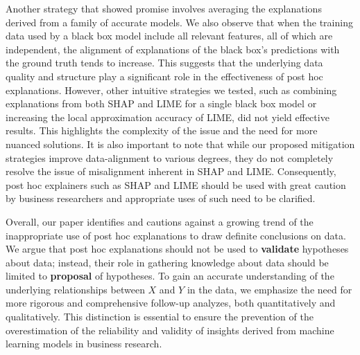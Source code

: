 \documentclass[mnsc,blindrev]{informs3}
\begin{document}
Another strategy that showed promise involves averaging the explanations derived from a family of accurate models. We also observe that when the training data used by a black box model include all relevant features, all of which are independent, the alignment of explanations of the black box's predictions with the ground truth tends to increase. This suggests that the underlying data quality and structure play a significant role in the effectiveness of post hoc explanations.
However, other intuitive strategies we tested, such as combining explanations from both SHAP and LIME for a single black box model or increasing the local approximation accuracy of LIME, did not yield effective results. This highlights the complexity of the issue and the need for more nuanced solutions.
It is also important to note that while our proposed mitigation strategies improve data-alignment to various degrees, they do not completely resolve the issue of misalignment inherent in SHAP and LIME. Consequently, post hoc explainers such as SHAP and LIME should be used with great caution by business researchers and appropriate uses of such need to be clarified.%


Overall, our paper identifies and cautions against a growing trend of the inappropriate use of post hoc explanations to draw definite conclusions on data. We argue that post hoc explanations should not be used to \textbf{validate} hypotheses about data; instead, their role in gathering knowledge about data should be limited to \textbf{proposal} of hypotheses. To gain an accurate understanding of the underlying relationships between $X$ and $Y$ in the data, we emphasize the need for more rigorous and comprehensive follow-up analyzes, both quantitatively and qualitatively. This distinction is essential to ensure the prevention of the overestimation of the reliability and validity of insights derived from machine learning models in business research.
\end{document}
